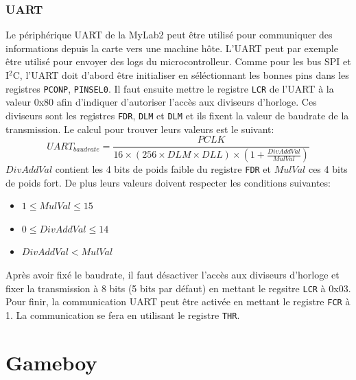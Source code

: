 \documentclass[a4paper]{article}
\begin{document}
\subsubsection{UART}
Le périphérique UART de la MyLab2 peut être utilisé pour communiquer des informations
depuis la carte vers une machine hôte. L'UART peut par exemple être utilisé pour
envoyer des logs du microcontrolleur. Comme pour les bus SPI et I$^2$C, l'UART
doit d'abord être initialiser en séléctionnant les bonnes pins dans les registres
\texttt{PCONP}, \texttt{PINSEL0}. Il faut ensuite mettre le registre
\texttt{LCR} de l'UART à la valeur 0x80 afin d'indiquer d'autoriser l'accès aux diviseurs 
d'horloge. Ces diviseurs sont les registres \texttt{FDR}, \texttt{DLM}
et \texttt{DLM} et ils fixent la valeur de baudrate de la transmission.
Le calcul pour trouver leurs valeurs est le suivant:
\begin{equation*}
	UART_{baudrate}=\frac{PCLK}{16 \times (256 \times DLM \times DLL) \times (1 + \frac{DivAddVal}{MulVal})}
\end{equation*}
$DivAddVal$ contient les 4 bits de poids faible du registre \texttt{FDR} et
$MulVal$ ces 4 bits de poids fort. De plus leurs valeurs doivent respecter les conditions
suivantes:
\begin{itemize}[label=\textbullet]
	\item $1 \leq MulVal \leq 15$
	\item $0 \leq DivAddVal \leq 14$
	\item $DivAddVal < MulVal$ 
\end{itemize}
Après avoir fixé le baudrate, il faut désactiver l'accès aux diviseurs d'horloge
et fixer la transmission à 8 bits (5 bits par défaut) en mettant le regsitre
\texttt{LCR} à 0x03. Pour finir, la communication UART peut être activée
en mettant le registre \texttt{FCR} à 1. La communication se fera en utilisant
le registre \texttt{THR}.

\newpage


\section{Gameboy}
\end{document}
